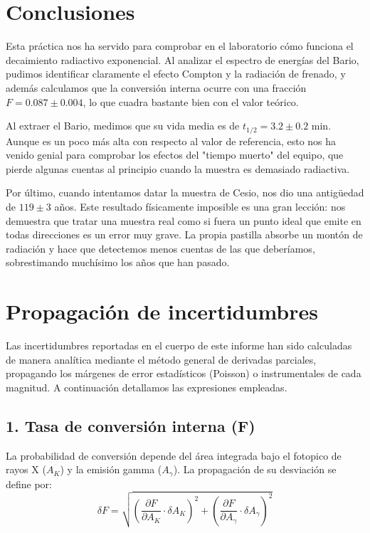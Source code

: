 \documentclass[9pt,a4paper,twocolumn,twoside]{rho-class/rho}
\begin{document}
\section{Conclusiones}

Esta práctica nos ha servido para comprobar en el laboratorio cómo funciona el decaimiento radiactivo exponencial. Al analizar el espectro de energías del Bario, pudimos identificar claramente el efecto Compton y la radiación de frenado, y además calculamos que la conversión interna ocurre con una fracción $F = 0.087 \pm 0.004$, lo que cuadra bastante bien con el valor teórico.

Al extraer el Bario, medimos que su vida media es de $t_{1/2} = 3.2 \pm 0.2$ min. Aunque es un poco más alta con respecto al valor de referencia, esto nos ha venido genial para comprobar los efectos del "tiempo muerto" del equipo, que pierde algunas cuentas al principio cuando la muestra es demasiado radiactiva.

Por último, cuando intentamos datar la muestra de Cesio, nos dio una antigüedad de $119 \pm 3$ años. Este resultado físicamente imposible es una gran lección: nos demuestra que tratar una muestra real como si fuera un punto ideal que emite en todas direcciones es un error muy grave. La propia pastilla absorbe un montón de radiación y hace que detectemos menos cuentas de las que deberíamos, sobrestimando muchísimo los años que han pasado.

\newpage
\appendix
\section{Propagación de incertidumbres}

Las incertidumbres reportadas en el cuerpo de este informe han sido calculadas de manera analítica mediante el método general de derivadas parciales, propagando los márgenes de error estadísticos (Poisson) o instrumentales de cada magnitud. A continuación detallamos las expresiones empleadas.

\subsection*{1. Tasa de conversión interna (F)}
La probabilidad de conversión depende del área integrada bajo el fotopico de rayos X ($A_K$) y la emisión gamma ($A_\gamma$). La propagación de su desviación se define por:
\vspace{0.2cm}
\begin{equation*}
    \delta F = \sqrt{ \left( \frac{\partial F}{\partial A_K} \cdot \delta A_K \right)^2 + \left( \frac{\partial F}{\partial A_\gamma} \cdot \delta A_\gamma \right)^2 }
\end{equation*}
\vspace{0.2cm}
\end{document}
